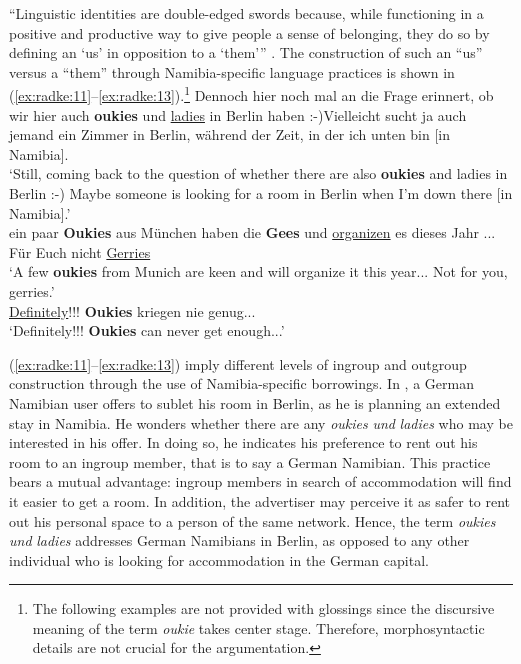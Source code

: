 \documentclass[output=paper]{langsci/langscibook}
\begin{document}
“Linguistic identities are double-edged swords because, while functioning in a positive and productive way to give people a sense of belonging, they do so by defining an ‘us’ in opposition to a ‘them’” \citep[261]{joseph_linguistic_2006}. The construction of such an “us” versus a “them” through Namibia-specific language practices is shown in (\ref{ex:radke:11}--\ref{ex:radke:13}).\footnote{The following examples are not provided with glossings since the discursive meaning of the term \textit{oukie} takes center stage. Therefore, morphosyntactic details are not crucial for the argumentation.}
\ea
\label{ex:radke:11}
Dennoch hier noch mal an die Frage erinnert, ob wir hier auch \textbf{oukies} und \underline{ladies} in Berlin haben :-)Vielleicht sucht ja auch jemand ein Zimmer in Berlin, während der Zeit, in der ich unten bin [in Namibia].\smallskip\\\relax
‘Still, coming back to the question of whether there are also \textbf{oukies} and ladies in Berlin :-) Maybe someone is looking for a room in Berlin when I'm down there [in Namibia].’\\
\ex\label{ex:radke:12}
ein paar \textbf{Oukies} aus München haben die \textbf{Gees} und \underline{organizen} es dieses Jahr ... Für Euch nicht \underline{Gerries}\smallskip\\\relax
‘A few \textbf{oukies} from Munich are keen and will organize it this year... Not for you, gerries.’\\
\ex\label{ex:radke:13}
 \underline{Definitely}!!! \textbf{Oukies} kriegen nie genug...\smallskip\\\relax
‘{Definitely!!!} \textbf{{Oukies}} {can never get enough...}’\\
\z

(\ref{ex:radke:11}--\ref{ex:radke:13}) imply different levels of ingroup and outgroup construction through the use of Namibia-specific borrowings. In , a German Namibian user offers to sublet his room in Berlin, as he is planning an extended stay in Namibia. He wonders whether there are any \textit{oukies} \textit{und} \textit{ladies} who may be interested in his offer. In doing so, he indicates his preference to rent out his room to an ingroup member, that is to say a German Namibian. This practice bears a mutual advantage: ingroup members in search of accommodation will find it easier to get a room. In addition, the advertiser may perceive it as safer to rent out his personal space to a person of the same network. Hence, the term \textit{oukies} \textit{und} \textit{ladies} addresses German Namibians in Berlin, as opposed to any other individual who is looking for accommodation in the German capital.
\end{document}
